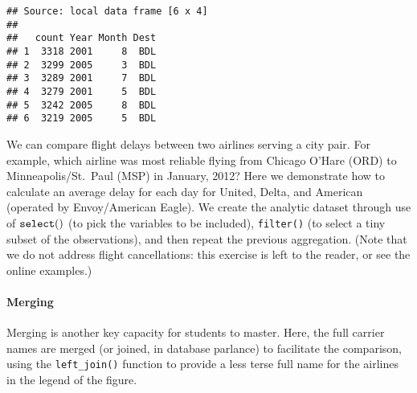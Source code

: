 \documentclass[]{article}
\newenvironment{Shaded}{\begin{snugshade}}{\end{snugshade}}
\newcommand{\KeywordTok}[1]{\textcolor[rgb]{0.13,0.29,0.53}{\textbf{{#1}}}}
\newcommand{\DataTypeTok}[1]{\textcolor[rgb]{0.13,0.29,0.53}{{#1}}}
\newcommand{\DecValTok}[1]{\textcolor[rgb]{0.00,0.00,0.81}{{#1}}}
\newcommand{\StringTok}[1]{\textcolor[rgb]{0.31,0.60,0.02}{{#1}}}
\newcommand{\NormalTok}[1]{{#1}}
\begin{document}
\begin{verbatim}
## Source: local data frame [6 x 4]
## 
##   count Year Month Dest
## 1  3318 2001     8  BDL
## 2  3299 2005     3  BDL
## 3  3289 2001     7  BDL
## 4  3279 2001     5  BDL
## 5  3242 2005     8  BDL
## 6  3219 2005     5  BDL
\end{verbatim}

We can compare flight delays between two airlines serving a city pair.
For example, which airline was most reliable flying from Chicago O'Hare
(ORD) to Minneapolis/St.~Paul (MSP) in January, 2012? Here we
demonstrate how to calculate an average delay for each day for United,
Delta, and American (operated by Envoy/American Eagle). We create the
analytic dataset through use of ${\tt select()}$ (to pick the variables
to be included), \texttt{filter()} (to select a tiny subset of the
observations), and then repeat the previous aggregation. (Note that we
do not address flight cancellations: this exercise is left to the
reader, or see the online examples.)

\begin{Shaded}
\end{Shaded}

\paragraph{Merging}\label{merging}

Merging is another key capacity for students to master. Here, the full
carrier names are merged (or joined, in database parlance) to facilitate
the comparison, using the \texttt{left\_join()} function to provide a
less terse full name for the airlines in the legend of the figure.
\end{document}
